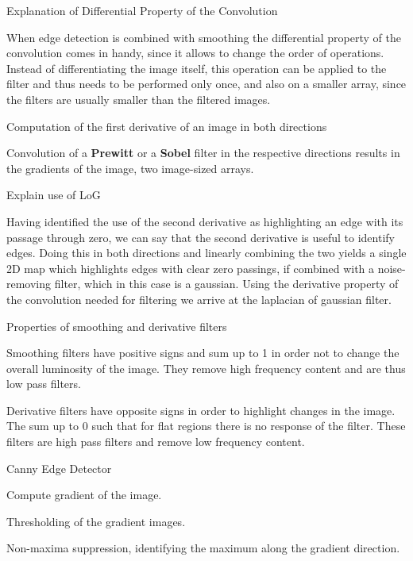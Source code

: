 \documentclass[10pt,a4paper]{scrartcl}
\begin{document}
\begin{multicols*}{2}
\begin{QandA}{Explanation of Differential Property of the Convolution}
\item When edge detection is combined with smoothing the differential property of the convolution comes in handy, since it allows to change the order of operations. Instead of differentiating the image itself, this operation can be applied to the filter and thus needs to be performed only once, and also on a smaller array, since the filters are usually smaller than the filtered images.
\end{QandA}

\begin{QandA}{Computation of the first derivative of an image in both directions}
\item Convolution of a \textbf{Prewitt} or a \textbf{Sobel} filter in the respective directions results in the gradients of the image, two image-sized arrays.
\end{QandA}

\begin{QandA}{Explain use of LoG}
\item Having identified the use of the second derivative as highlighting an edge with its passage through zero, we can say that the second derivative is useful to identify edges. Doing this in both directions and linearly combining the two yields a single 2D map which highlights edges with clear zero passings, if combined with a noise-removing filter, which in this case is a gaussian. Using the derivative property of the convolution needed for filtering we arrive at the laplacian of gaussian filter.
\end{QandA}

\begin{QandA}{Properties of smoothing and derivative filters}
\item Smoothing filters have positive signs and sum up to 1 in order not to change the overall luminosity of the image. They remove high frequency content and are thus low pass filters.
\item Derivative filters have opposite signs in order to highlight changes in the image. The sum up to 0 such that for flat regions there is no response of the filter. These filters are high pass filters and remove low frequency content.
\end{QandA}

\begin{QandA}{Canny Edge Detector}
\item Compute gradient of the image.
\item Thresholding of the gradient images.
\item Non-maxima suppression, identifying the maximum along the gradient direction.
\end{QandA}


\end{multicols*}
\end{document}
